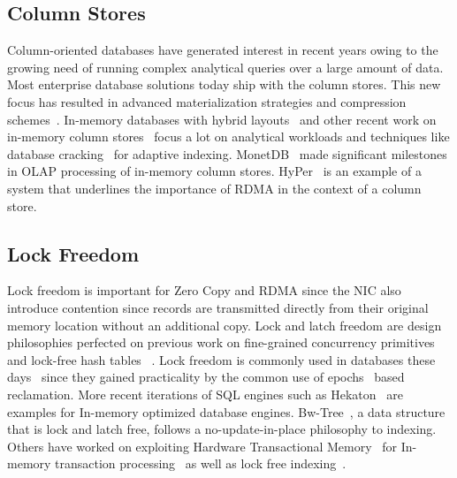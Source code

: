 \subsection{Column Stores}
Column-oriented databases have generated interest in recent years owing to the growing 
need of running complex analytical queries over a large amount of data. Most enterprise 
database solutions today ship with the column stores. This new focus has resulted 
in advanced materialization strategies and compression schemes~\cite{cstore,cstorevsrowstore,cstore-material,cstorecompression}.
In-memory databases with hybrid layouts~\cite{hybridinmemorycolstore} and other recent work on in-memory column stores~\cite{inmemorycracking} 
focus a lot on analytical workloads and techniques like database cracking~\cite{databasecracking} for adaptive indexing. 
MonetDB~\cite{monetdb} made significant milestones in OLAP processing of in-memory column stores. HyPer~\cite{hyperhybrid} 
is an example of a system that underlines the importance of RDMA in the context of a column store.


\subsection{Lock Freedom}
Lock freedom is important for Zero Copy and RDMA since the NIC also introduce contention 
since records are transmitted directly from their original memory location without an 
additional copy. Lock and latch freedom are 
design philosophies perfected on previous work on fine-grained concurrency 
primitives~\cite{finegrained} and lock-free hash tables ~\cite{lockfreeht}. Lock freedom is commonly
used in databases these days~\cite{htm} since they gained practicality by the common use of
epochs~\cite{lockfreedom} based reclamation. 
More recent iterations of SQL engines such as Hekaton~\cite{hekaton} are 
examples for In-memory optimized  database engines. Bw-Tree~\cite{bw-tree}, a 
data structure that is lock and latch free, follows a no-update-in-place philosophy to indexing.
Others have worked on exploiting Hardware Transactional Memory~\cite{htm-old}
for In-memory transaction processing~\cite{drtm} as well as lock free indexing~\cite{htm}.

